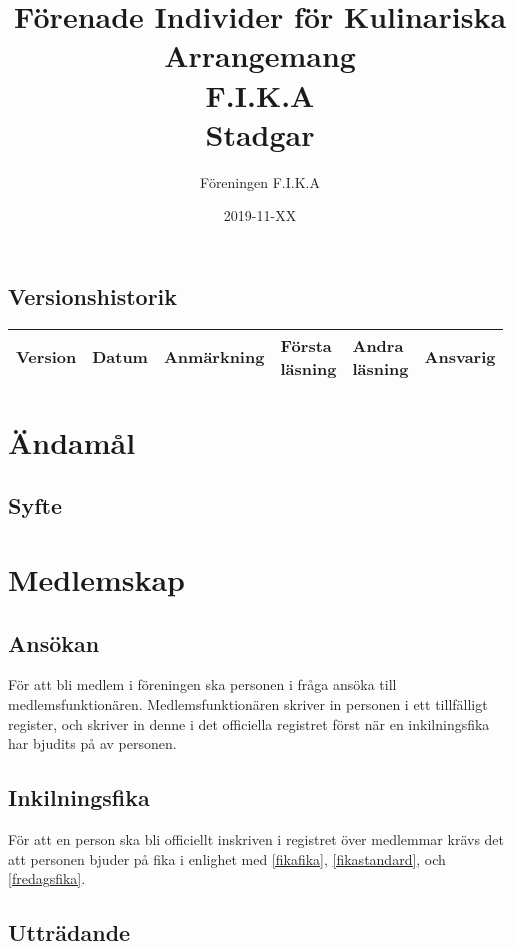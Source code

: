 \documentclass{article}
\title{Förenade Individer för Kulinariska Arrangemang \\
                F.I.K.A \\
                Stadgar}
\author{Föreningen F.I.K.A}
\date{2019-11-XX}
\begin{document}
\maketitle
\newpage

\subsection*{Versionshistorik}

\begin{tabularx}{\textwidth}{|l|l|X|l|l|l|}
\hline
Version & Datum & Anmärkning & \makecell{Första\\läsning} & \makecell{Andra\\läsning} & Ansvarig \\
\hline
\end{tabularx}
\newpage

\tableofcontents
\newpage
{}

\section{Ändamål}
\subsection{Syfte}

\section{Medlemskap}
\subsection{Ansökan}
För att bli medlem i föreningen ska personen i fråga ansöka till
medlemsfunktionären. Medlemsfunktionären skriver in personen i ett tillfälligt
register, och skriver in denne i det officiella registret först när en
inkilningsfika har bjudits på av personen.

\subsection{Inkilningsfika}
För att en person ska bli officiellt inskriven i registret över medlemmar krävs
det att personen bjuder på fika i enlighet med \ref{fikafika},
\ref{fikastandard}, och \ref{fredagsfika}.

\subsection{Utträdande}
\end{document}
